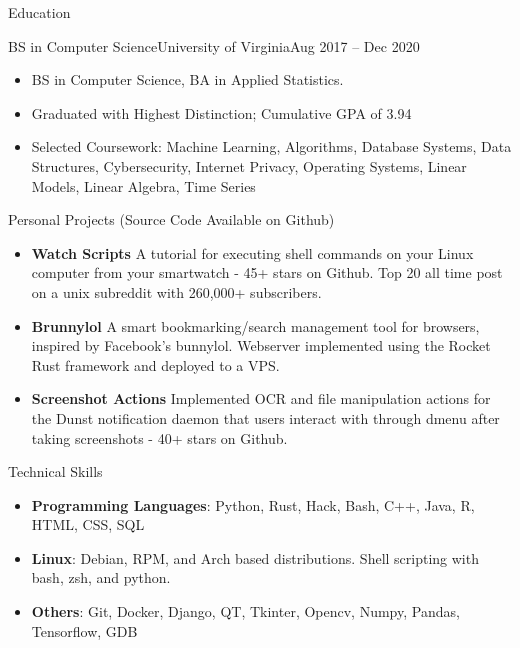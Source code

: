\documentclass[]{mcdowellcv}
\begin{document}
\begin{cvsection}{Education}
    \begin{cvsubsection}{BS in Computer Science}{University of Virginia}{Aug 2017 -- Dec 2020}
        \begin{itemize}
            \item BS in Computer Science, BA in Applied Statistics.
            \item Graduated with Highest Distinction; Cumulative GPA of 3.94
            \item Selected Coursework: Machine Learning, Algorithms, Database Systems, Data Structures, Cybersecurity, Internet Privacy, Operating Systems, Linear Models, Linear Algebra, Time Series
        \end{itemize}
    \end{cvsubsection}
\end{cvsection}
\begin{cvsection}{Personal Projects (Source Code Available on Github)}
    \begin{cvsubsection}{}{}{}
        \begin{itemize}
            \setlength\itemsep{3pt}
            \item \textbf{Watch Scripts}  A tutorial for executing shell commands on your Linux computer from your smartwatch - 45+ stars on Github. Top 20 all time post on a unix subreddit with 260,000+ subscribers.
            \item \textbf{Brunnylol}  A smart bookmarking/search management tool for browsers, inspired by Facebook's bunnylol. Webserver implemented using the Rocket Rust framework and deployed to a VPS.
            \item \textbf{Screenshot Actions}  Implemented OCR and file manipulation actions for the Dunst notification daemon that users interact with through dmenu after taking screenshots - 40+ stars on Github.
        \end{itemize}
    \end{cvsubsection}
\end{cvsection}
\begin{cvsection}{Technical Skills}
    \begin{cvsubsection}{}{}{}
        \begin{itemize}
            \item \textbf{Programming Languages}:  Python, Rust, Hack, Bash, C++, Java, R, HTML, CSS, SQL
            \item \textbf{Linux}: Debian, RPM, and Arch based distributions. Shell scripting with bash, zsh, and python.
            \item \textbf{Others}:  Git, Docker, Django, QT, Tkinter, Opencv, Numpy, Pandas, Tensorflow, GDB
        \end{itemize}
    \end{cvsubsection}
\end{cvsection}
\end{document}
